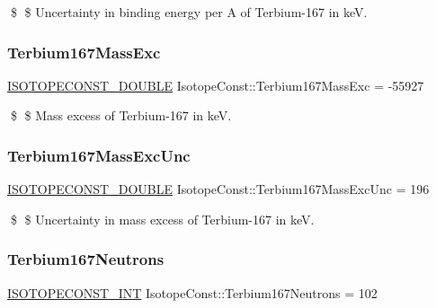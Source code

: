 \$ \$ Uncertainty in binding energy per A of Terbium-\/167 in keV. \mbox{\label{group___isotope_const-_terbium-_tb167_gad6ac52bc9282a0abd587c20ad1c4bd9a}} 
\subsubsection{\texorpdfstring{Terbium167\+Mass\+Exc}{Terbium167MassExc}}
{\footnotesize\ttfamily \mbox{\hyperlink{group___isotope_const-_macros_ga8f45a7272ce02c0b4c65c44636ed719a}{I\+S\+O\+T\+O\+P\+E\+C\+O\+N\+S\+T\+\_\+\+D\+O\+U\+B\+LE}} Isotope\+Const\+::\+Terbium167\+Mass\+Exc = -\/55927}

\$ \$ Mass excess of Terbium-\/167 in keV. \mbox{\label{group___isotope_const-_terbium-_tb167_ga7b9cd29f7760ff17b6f3ab25884023dd}} 
\subsubsection{\texorpdfstring{Terbium167\+Mass\+Exc\+Unc}{Terbium167MassExcUnc}}
{\footnotesize\ttfamily \mbox{\hyperlink{group___isotope_const-_macros_ga8f45a7272ce02c0b4c65c44636ed719a}{I\+S\+O\+T\+O\+P\+E\+C\+O\+N\+S\+T\+\_\+\+D\+O\+U\+B\+LE}} Isotope\+Const\+::\+Terbium167\+Mass\+Exc\+Unc = 196}

\$ \$ Uncertainty in mass excess of Terbium-\/167 in keV. \mbox{\label{group___isotope_const-_terbium-_tb167_ga734b49ccf61e8c50d005592b45e673b3}} 
\subsubsection{\texorpdfstring{Terbium167\+Neutrons}{Terbium167Neutrons}}
{\footnotesize\ttfamily \mbox{\hyperlink{group___isotope_const-_macros_ga5f18360b3e99483a35c32d789e62621c}{I\+S\+O\+T\+O\+P\+E\+C\+O\+N\+S\+T\+\_\+\+I\+NT}} Isotope\+Const\+::\+Terbium167\+Neutrons = 102}

